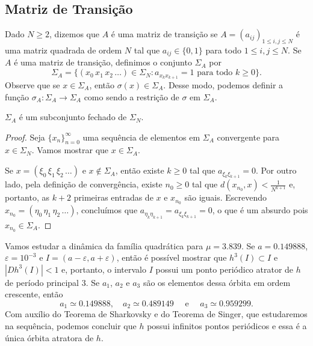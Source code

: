 \subsection{Matriz de Transição}

Dado $N \geq 2$, dizemos que $A$ é uma matriz de transição se $A = (a_{ij})_{1 \leq i,j \leq N}$ é uma matriz quadrada de ordem $N$ tal que $a_{ij} \in \lbrace 0, 1 \rbrace$ para todo $1 \leq i,j \leq N$.
Se $A$ é uma matriz de transição, definimos o conjunto $\Sigma_A$ por
$$\Sigma_A = \lbrace (x_0 \, x_1 \, x_2 \, \dots) \in \Sigma_N : a_{x_k x_{k+1}} = 1 \text{ para todo } k \geq 0 \rbrace.$$
Observe que se $x \in \Sigma_A$, então $\sigma(x) \in \Sigma_A$.
Desse modo, podemos definir a função $\sigma_A: \Sigma_A \to \Sigma_A$ como sendo a restrição de $\sigma$ em $\Sigma_A$.

\begin{proposition}
$\Sigma_A$ é um subconjunto fechado de $\Sigma_N$.
\end{proposition}

\begin{proof}
Seja $\lbrace x_n \rbrace_{n=0}^{\infty}$ uma sequência de elementos em $\Sigma_A$ convergente para $x \in \Sigma_N$.
Vamos mostrar que $x \in \Sigma_A$.

Se $x = (\xi_0 \, \xi_1 \, \xi_2 \, \dots)$ e $x \notin \Sigma_A$, então existe $k \geq 0$ tal que $a_{\xi_k \xi_{k+1}} = 0$. Por outro lado, pela definição de convergência, existe $n_0 \geq 0$ tal que $d(x_{n_0}, x) < \frac{1}{N^{k+1}}$ e, portanto, as $k+2$ primeiras entradas de $x$ e $x_{n_0}$ são iguais. Escrevendo $x_{n_0} = (\eta_0 \, \eta_1 \, \eta_2 \, \dots)$, concluímos que $a_{\eta_k \eta_{k+1}} = a_{\xi_k \xi_{k+1}} = 0$, o que é um absurdo pois $x_{n_0} \in \Sigma_A$.
\end{proof}

Vamos estudar a dinâmica da família quadrática para $\mu = 3.839$.
Se $a = 0.149888$, $\varepsilon = 10^{-3}$ e $I = (a - \varepsilon, a + \varepsilon)$, então é possível mostrar que $h^3(I) \subset I$ e $|D h^3(I)| < 1$ e, portanto, o intervalo $I$ possui um ponto periódico atrator de $h$ de período principal $3$. Se $a_1$, $a_2$ e $a_3$ são os elementos dessa órbita em ordem crescente, então
$$a_1 \simeq 0.149888, \quad a_2 \simeq 0.489149 \quad \text{ e } \quad a_3 \simeq 0.959299.$$
Com auxílio do Teorema de Sharkovsky e do Teorema de Singer, que estudaremos na sequência, podemos concluir que $h$ possui infinitos pontos periódicos e essa é a única órbita atratora de $h$.


